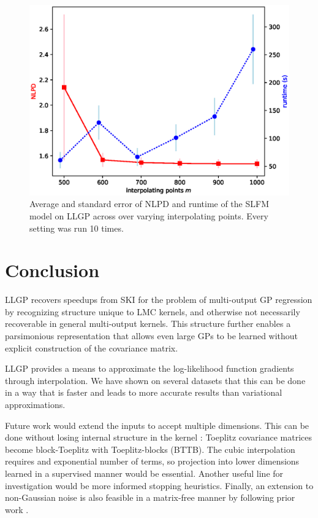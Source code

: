 \documentclass{article}
\begin{document}
\begin{figure}[!ht]
\vskip 0.1in
\begin{center}
\centerline{\includegraphics[width=\columnwidth]{m_time_nlpd.eps}}
\caption{Average and standard error of NLPD and runtime of the SLFM model on LLGP across over varying interpolating points. Every setting was run 10 times.}
\label{fig:llgpweather}
\end{center}
\vskip -0.1in
\end{figure}
\section{Conclusion}\label{conclusion}

LLGP recovers speedups from SKI \cite{kiss-gp} for the problem of multi-output GP regression by recognizing structure unique to LMC kernels, and otherwise not necessarily recoverable in general multi-output kernels. This structure further enables a parsimonious representation that allows even large GPs to be learned without explicit construction of the covariance matrix.

LLGP provides a means to approximate the log-likelihood function gradients through interpolation. We have shown on several datasets that this can be done in a way that is faster and leads to more accurate results than variational approximations.

Future work would extend the inputs to accept multiple dimensions. This can be done without losing internal structure in the kernel \cite{msgp}: Toeplitz covariance matrices become block-Toeplitz with Toeplitz-blocks (BTTB). The cubic interpolation requires and exponential number of terms, so projection into lower dimensions learned in a supervised manner would be essential. Another useful line for investigation would be more informed stopping heuristics. Finally, an extension to non-Gaussian noise is also feasible in a matrix-free manner by following prior work \cite{cutajar2016preconditioning}.



\end{document}
